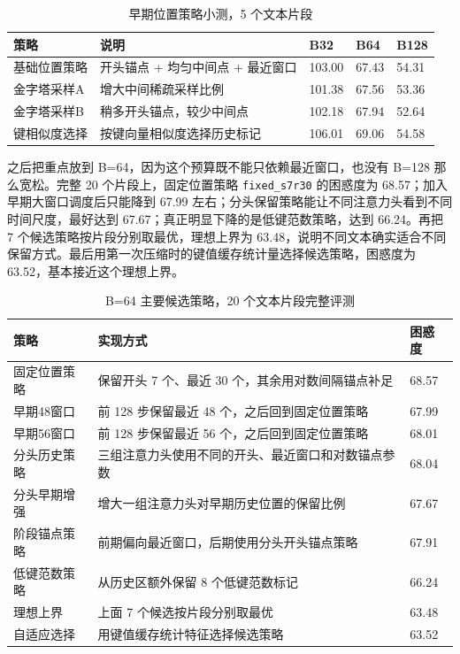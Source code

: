 \documentclass[12pt,a4paper,UTF8]{ctexart}
\newcommand{\xiaosi}{\fontsize{12pt}{18pt}\selectfont}
\newenvironment{reportbody}{\songti\xiaosi\onehalfspacing\sloppy}{}
\begin{document}
\begin{reportbody}
\begin{table}[htbp]
  \caption{早期位置策略小测，5 个文本片段}
  \label{tab:kv-early-small}
  \centering
  \begin{tabular}{@{}C{28mm}C{54mm}C{13mm}C{13mm}C{13mm}@{}}
    \toprule
    策略 & 说明 & B32 & B64 & B128 \\
    \midrule
    基础位置策略 & 开头锚点 + 均匀中间点 + 最近窗口 & 103.00 & 67.43 & 54.31 \\
    金字塔采样A & 增大中间稀疏采样比例 & 101.38 & 67.56 & 53.36 \\
    金字塔采样B & 稍多开头锚点，较少中间点 & 102.18 & 67.94 & 52.64 \\
    键相似度选择 & 按键向量相似度选择历史标记 & 106.01 & 69.06 & 54.58 \\
    \bottomrule
  \end{tabular}
\end{table}

之后把重点放到 B=64，因为这个预算既不能只依赖最近窗口，也没有 B=128 那么宽松。完整 20 个片段上，固定位置策略 \texttt{fixed\_s7r30} 的困惑度为 68.57；加入早期大窗口调度后只能降到 67.99 左右；分头保留策略能让不同注意力头看到不同时间尺度，最好达到 67.67；真正明显下降的是低键范数策略，达到 66.24。再把 7 个候选策略按片段分别取最优，理想上界为 63.48，说明不同文本确实适合不同保留方式。最后用第一次压缩时的键值缓存统计量选择候选策略，困惑度为 63.52，基本接近这个理想上界。

\begin{table}[htbp]
  \caption{B=64 主要候选策略，20 个文本片段完整评测}
  \centering
  \begin{tabular}{C{30mm}C{76mm}C{17mm}}
    \toprule
    策略 & 实现方式 & 困惑度 \\
    \midrule
    固定位置策略 & 保留开头 7 个、最近 30 个，其余用对数间隔锚点补足 & 68.57 \\
    早期48窗口 & 前 128 步保留最近 48 个，之后回到固定位置策略 & 67.99 \\
    早期56窗口 & 前 128 步保留最近 56 个，之后回到固定位置策略 & 68.01 \\
    分头历史策略 & 三组注意力头使用不同的开头、最近窗口和对数锚点参数 & 68.04 \\
    分头早期增强 & 增大一组注意力头对早期历史位置的保留比例 & 67.67 \\
    阶段锚点策略 & 前期偏向最近窗口，后期使用分头开头锚点策略 & 67.91 \\
    低键范数策略 & 从历史区额外保留 8 个低键范数标记 & 66.24 \\
    理想上界 & 上面 7 个候选按片段分别取最优 & 63.48 \\
    自适应选择 & 用键值缓存统计特征选择候选策略 & 63.52 \\
    \bottomrule
  \end{tabular}
\end{table}


\end{reportbody}
\end{document}
